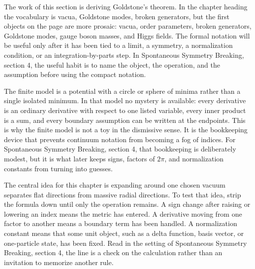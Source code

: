 











The work of this section is deriving Goldstone's theorem.  In the chapter heading the vocabulary is vacua, Goldstone modes, broken generators, but the first objects on the page are more prosaic: vacua, order parameters, broken generators, Goldstone modes, gauge boson masses, and Higgs fields.  The formal notation will be useful only after it has been tied to a limit, a symmetry, a normalization condition, or an integration-by-parts step.  In Spontaneous Symmetry Breaking, section 4, the useful habit is to name the object, the operation, and the assumption before using the compact notation.

The finite model is a potential with a circle or sphere of minima rather than a single isolated minimum.  In that model no mystery is available: every derivative is an ordinary derivative with respect to one listed variable, every inner product is a sum, and every boundary assumption can be written at the endpoints.  This is why the finite model is not a toy in the dismissive sense.  It is the bookkeeping device that prevents continuum notation from becoming a fog of indices.  For Spontaneous Symmetry Breaking, section 4, that bookkeeping is deliberately modest, but it is what later keeps signs, factors of \(2\pi\), and normalization constants from turning into guesses.

The central idea for this chapter is expanding around one chosen vacuum separates flat directions from massive radial directions.  To test that idea, strip the formula down until only the operation remains.  A sign change after raising or lowering an index means the metric has entered.  A derivative moving from one factor to another means a boundary term has been handled.  A normalization constant means that some unit object, such as a delta function, basis vector, or one-particle state, has been fixed.  Read in the setting of Spontaneous Symmetry Breaking, section 4, the line is a check on the calculation rather than an invitation to memorize another rule.

